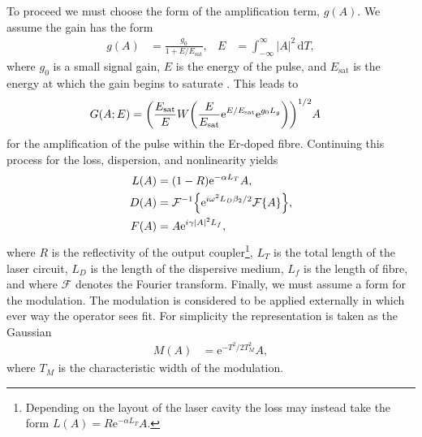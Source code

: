 \documentclass[10pt,twocolumn,a4paper]{article}
\let\originalleft\left
\let\originalright\right
\renewcommand{\left}{\mathopen{}\mathclose\bgroup\originalleft}
\renewcommand{\right}{\aftergroup\egroup\originalright}
\providecommand{\df}{\textrm{d}}
\newcommand{\Es}{E_{\textrm{sat}}}
\newcommand{\FT}[1]{\mathcal{F}\left\{ #1 \right\}}
\newcommand{\FTi}[1]{\mathcal{F}^{-1}\left\{ #1 \right\}}
\begin{document}
To proceed we must choose the form of the amplification term, $g(A)$. We assume the gain has the form
\begin{align}
	g(A) &= \frac{g_0}{1 + E / \Es},& E &= \int_{-\infty}^\infty |A|^2 \, \df T,
	\label{eq:energy}
\end{align}
where $g_0$ is a small signal gain, $E$ is the energy of the pulse, and $\Es$ is the energy at which the gain begins to saturate \cite{bohun, burgoyne2014, haus1975, hausbook, haus1992, haus2000, haus1991, kartner, peng, shtyrina, silfvast, usechak, yarutkina}. This leads to
\begin{align}
	G(A;E) &= \left( \frac{\Es}{E} W \left( \frac{E}{\Es} \textrm{e}^{E/\Es} \textrm{e}^{g_0 L_g} \right) \right)^{1/2} A
\end{align}
for the amplification of the pulse within the Er-doped fibre. Continuing this process for the loss, dispersion, and nonlinearity yields
\begin{align}
	L(A) &= (1 - R) \textrm{e}^{- \alpha L_T}A, \\
	D(A) &= \FTi{\textrm{e}^{i \omega^2 L_D\beta_2/2} \FT{A}}, \\
	F(A) &= A \textrm{e}^{i \gamma |A|^2 L_f},
\end{align}
where $R$ is the reflectivity of the output coupler\footnote{Depending on the layout of the laser cavity the loss may instead take the form $L(A) = R \textrm{e}^{- \alpha L_T}A$.}, $L_T$ is the total length of the laser circuit, $L_D$ is the length of the dispersive medium, $L_f$ is the length of fibre, and where $\mathcal{F}$ denotes the Fourier transform. Finally, we must assume a form for the modulation. The modulation is considered to be applied externally in which ever way the operator sees fit. For simplicity the representation is taken as the Gaussian
\begin{align}
	M(A) &= \textrm{e}^{-T^2 / 2 T_M^2} A,
\end{align}
where $T_M$ is the characteristic width of the modulation.
\end{document}
